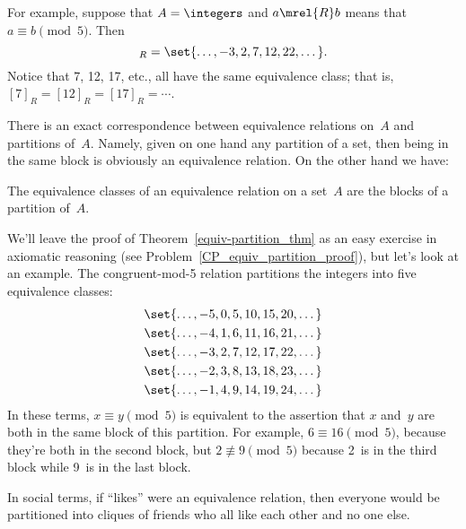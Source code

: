 For example, suppose that $A = \integers$ and $a \mrel{R} b$ means
that $a \equiv b \pmod{5}$.  Then
\begin{equation*}
    [7]_R = \set{\dots, -3, 2, 7, 12, 22, \dots}.
\end{equation*}
Notice that 7, 12, 17, etc., all have the same equivalence class; that
is, $[7]_R = [12]_R = [17]_R = \cdots$.

There is an exact correspondence between equivalence relations on~$A$
and partitions of~$A$.  Namely, given on one hand any partition of a
set, then being in the same block is obviously an equivalence
relation.  On the other hand we have:
\begin{theorem}\label{equiv-partition_thm}
The equivalence classes of an equivalence relation on a set~$A$ are
the blocks of a partition of~$A$.
\end{theorem}

We'll leave the proof of Theorem~\ref{equiv-partition_thm} as an easy
exercise in axiomatic reasoning (see
Problem~\ref{CP_equiv_partition_proof}), but let's look at an example.
The congruent-mod-5 relation partitions the integers into five
equivalence classes:
\begin{gather*}
    \set{ \dots, -5, 0, 5, 10, 15, 20, \dots } \\
    \set{ \dots, -4, 1, 6, 11, 16, 21, \dots } \\
    \set{ \dots, -3, 2, 7, 12, 17, 22, \dots } \\
    \set{ \dots, -2, 3, 8, 13, 18, 23, \dots } \\
    \set{ \dots, -1, 4, 9, 14, 19, 24, \dots }
\end{gather*}
In these terms, $x \equiv y \pmod{5}$ is equivalent to the assertion
that $x$ and~$y$ are both in the same block of this partition.  For
example, $6 \equiv 16 \pmod{5}$, because they're both in the second
block, but $2 \not\equiv 9 \pmod{5}$ because 2~is in the third block
while 9~is in the last block.

In social terms, if ``likes'' were an equivalence relation, then
everyone would be partitioned into cliques of friends who all like
each other and no one else.

\begin{problems}
\practiceproblems
{}

\classproblems
{}

\homeworkproblems
{}

\examproblems
{}

\end{problems}


